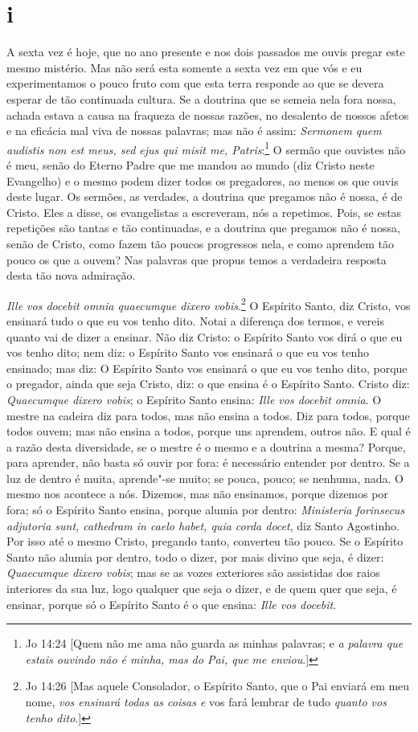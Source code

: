 \section*{i}

\noindent{}A sexta vez é hoje, que no ano presente e nos dois passados me ouvis
pregar este mesmo mistério. Mas não será esta somente a sexta vez em que
vós e eu experimentamos o pouco fruto com que esta terra responde ao que
se devera esperar de tão continuada cultura. Se a doutrina que se semeia
nela fora nossa, achada estava a causa na fraqueza de nossas razões, no
desalento de nossos afetos e na eficácia mal viva de nossas palavras;
mas não é assim: \emph{Sermonem quem audistis non est meus, sed ejus qui
misit me, Patris}:\footnote{Jo 14:24 [Quem não me ama não guarda as minhas palavras; e \emph{a palavra que estais ouvindo não é minha, mas do Pai, que me enviou}.]} O sermão que ouvistes não é meu, senão 
do Eterno Padre que me mandou ao mundo (diz Cristo neste Evangelho)
e o mesmo podem dizer todos os pregadores, ao menos os que ouvis
deste lugar. Os sermões, as verdades, a doutrina que pregamos não é
nossa, é de Cristo. Eles a disse, os evangelistas a escreveram, nós a
repetimos. Pois, se estas repetições são tantas e tão continuadas, e a
doutrina que pregamos não é nossa, senão de Cristo, como fazem tão
poucos progressos nela, e como aprendem tão pouco os que a ouvem? Nas
palavras que propus temos a verdadeira resposta desta tão nova
admiração.

\emph{Ille vos docebit omnia quaecumque dixero vobis}.\footnote{Jo 14:26 [Mas aquele Consolador, o Espírito Santo, que o Pai enviará em meu nome, \emph{vos ensinará
todas as coisas e} vos fará lembrar de tudo \emph{quanto vos tenho dito}.]} O Espírito Santo,
diz Cristo, vos ensinará tudo o que eu vos tenho dito. Notai
a diferença dos termos, e vereis quanto vai de dizer a ensinar. Não diz
Cristo: o Espírito Santo vos dirá o que eu vos tenho dito; nem diz: o
Espírito Santo vos ensinará o que eu vos tenho ensinado; mas diz: O
Espírito Santo vos ensinará o que eu vos tenho dito, porque o pregador,
ainda que seja Cristo, diz: o que ensina é o Espírito Santo. Cristo diz:
\emph{Quaecumque dixero vobis}; o Espírito Santo ensina: \emph{Ille vos
docebit omnia}. O mestre na cadeira diz para todos, mas não ensina a
todos. Diz para todos, porque todos ouvem; mas não ensina a todos,
porque uns aprendem, outros não. E qual é a razão desta diversidade, se
o mestre é o mesmo e a doutrina a mesma? Porque, para aprender, não
basta só ouvir por fora: é necessário entender por dentro. Se a luz de
dentro é muita, aprende"-se muito; se pouca, pouco; se nenhuma, nada. O
mesmo nos acontece a nós. Dizemos, mas não ensinamos, porque dizemos por
fora; só o Espírito Santo ensina, porque alumia por dentro:
\emph{Ministeria forinsecus adjutoria sunt, cathedram in caelo habet,
quia corda docet}, diz Santo Agostinho. Por isso até o mesmo Cristo,
pregando tanto, converteu tão pouco. Se o Espírito Santo não alumia por
dentro, todo o dizer, por mais divino que seja, é dizer:
\emph{Quaecumque dixero vobis}; mas se as vozes exteriores são
assistidas dos raios interiores da sua luz, logo qualquer que seja o
dizer, e de quem quer que seja, é ensinar, porque só o Espírito Santo é
o que ensina: \emph{Ille vos docebit}.

